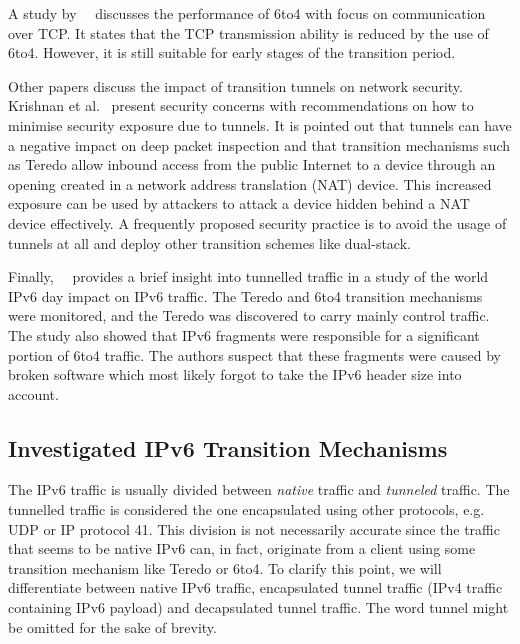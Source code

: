 A study by~\citeauthor{Bahaman-2012-Network}~\cite{Bahaman-2012-Network} discusses the performance of 6to4 with focus on communication over TCP. It states that the TCP transmission ability is reduced by the use of 6to4. However, it is still suitable for early stages of the transition period.

Other papers discuss the impact of transition tunnels on network security. Krishnan et al.~\cite{rfc6169} present security concerns with recommendations on how to minimise security exposure due to tunnels. It is pointed out that tunnels can have a negative impact on deep packet inspection and that transition mechanisms such as Teredo allow inbound access from the public Internet to a device through an opening created in a network address translation (NAT) device. This increased exposure can be used by attackers to attack a device hidden behind a NAT device effectively. A frequently proposed security practice is to avoid the usage of tunnels at all and deploy other transition schemes like dual-stack.

Finally,~\citeauthor{Sarrar-2012-Investigating}~\cite{Sarrar-2012-Investigating} provides a brief insight into tunnelled traffic in a study of the world IPv6 day impact on IPv6 traffic. The Teredo and 6to4 transition mechanisms were monitored, and the Teredo was discovered to carry mainly control traffic. The study also showed that IPv6 fragments were responsible for a significant portion of 6to4 traffic. The authors suspect that these fragments were caused by broken software which most likely forgot to take the IPv6 header size into account.

\subsection{Investigated IPv6 Transition Mechanisms} \label{subsec:ipv6-tunnel-traffic}

The IPv6 traffic is usually divided between \emph{native} traffic and \emph{tunneled} traffic. The tunnelled traffic is considered the one encapsulated using other protocols, e.g. UDP or IP protocol 41. This division is not necessarily accurate since the traffic that seems to be native IPv6 can, in fact, originate from a client using some transition mechanism like Teredo or 6to4. To clarify this point, we will differentiate between native IPv6 traffic, encapsulated tunnel traffic (IPv4 traffic containing IPv6 payload) and decapsulated tunnel traffic. The word tunnel might be omitted for the sake of brevity. 

